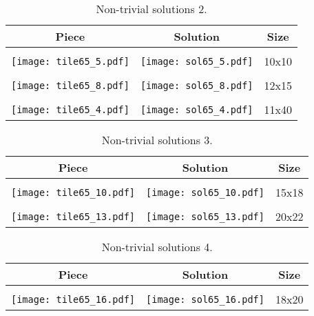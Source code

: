 \documentclass[10pt,a4paper]{article}
\theoremstyle{definition}
\begin{document}
\begin{table}[!htpb]
\centering
\begin{tabular}{|c|c|c|}
\hline
Piece & Solution & Size\\ \hline
 & & \\ 
\texttt{[image: tile65\_5.pdf]} &\texttt{[image: sol65\_5.pdf]} &10x10 \\ \hline
 & & \\ 
\texttt{[image: tile65\_8.pdf]} &\texttt{[image: sol65\_8.pdf]} &12x15 \\ \hline
 & & \\ 
\texttt{[image: tile65\_4.pdf]} &\texttt{[image: sol65\_4.pdf]} &11x40 \\ \hline
\end{tabular}
\caption{Non-trivial solutions 2.}
\label{tab:cool2}
\end{table}

\begin{table}[!htpb]
\centering
\begin{tabular}{|c|c|c|}
\hline
Piece & Solution & Size\\ \hline
 & & \\ 
\texttt{[image: tile65\_10.pdf]} &\texttt{[image: sol65\_10.pdf]} &15x18 \\ \hline
 & & \\ 
\texttt{[image: tile65\_13.pdf]} &\texttt{[image: sol65\_13.pdf]} &20x22 \\ \hline
\end{tabular}
\caption{Non-trivial solutions 3.}
\label{tab:cool3}
\end{table}

\pagebreak
\begin{table}[!htpb]
\centering
\begin{tabular}{|c|c|c|}
\hline
Piece & Solution & Size\\ \hline
 & & \\ 
\texttt{[image: tile65\_16.pdf]} &\texttt{[image: sol65\_16.pdf]} &18x20 \\ \hline
\end{tabular}
\caption{Non-trivial solutions 4.}
\label{tab:cool4}
\end{table}
\end{document}
